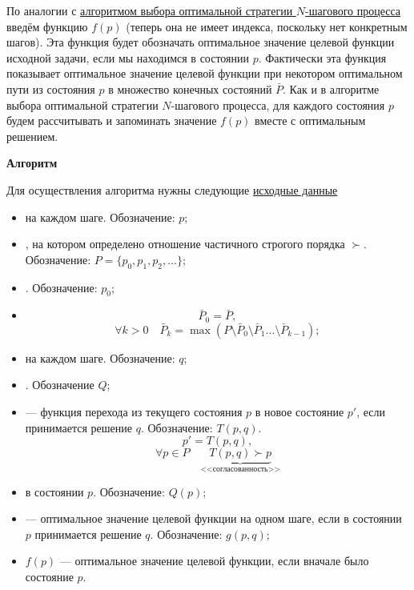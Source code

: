 По аналогии с \hyperref[alg:opt_strategy]{алгоритмом выбора оптимальной стратегии $N$-шагового процесса} введём функцию $f(p)$ (теперь она не имеет индекса, поскольку нет конкретным шагов). Эта функция будет обозначать оптимальное значение целевой функции исходной задачи, если мы находимся в состоянии $p$. Фактически эта функция показывает оптимальное значение целевой функции при некотором оптимальном пути из состояния $p$ в множество конечных состояний $\bar{P}$. Как и в алгоритме выбора оптимальной стратегии $N$-шагового процесса, для каждого состояния $p$ будем рассчитывать и запоминать значение $f(p)$ вместе с оптимальным решением.

\bigskip

\textbf{Алгоритм}

Для осуществления алгоритма нужны следующие \underline{исходные данные}

\begin{itemize}[nosep]
	\item {} на каждом шаге. Обозначение: $\boxed{p}$;
	
	\item {}, на котором определено отношение частичного строгого порядка $\succ$. Обозначение: $\boxed{P} = \{p_0, p_1, p_2, \dots\}$;
	
	\item {}. Обозначение: $\boxed{p_0}$;
	
	\item {}
	\[
	\bar{P}_0 = \bar{P},
	\]
	\[
	\forall k > 0 \quad \bar{P}_k = \max(P \setminus \bar{P}_0 \setminus \bar{P}_1 \dots \setminus \bar{P}_{k-1});
	\]

	\item {} на каждом шаге. Обозначение: $\boxed{q}$;
	
	\item {}. Обозначение $\boxed{Q}$;
	
	\item {} --- функция перехода из текущего состояния $p$ в новое состояние $p'$, если принимается решение $q$. Обозначение: $\boxed{T(p, q)}$.
	\[
	p' = T(p, q),
	\]
	\[
	\forall p \in P \quad \underbrace{T(p, q) \succ p}_{\text{<<согласованность>>}}
	\]
	
	\item {} в состоянии $p$. Обозначение: $\boxed{Q(p)}$;
	
	\item {} --- оптимальное значение целевой функции на одном шаге, если в состоянии $p$ принимается решение $q$. Обозначение: $\boxed{g(p, q)}$;
	
	\item $\boxed{f(p)}$ --- оптимальное значение целевой функции, если вначале было состояние $p$.
\end{itemize}

